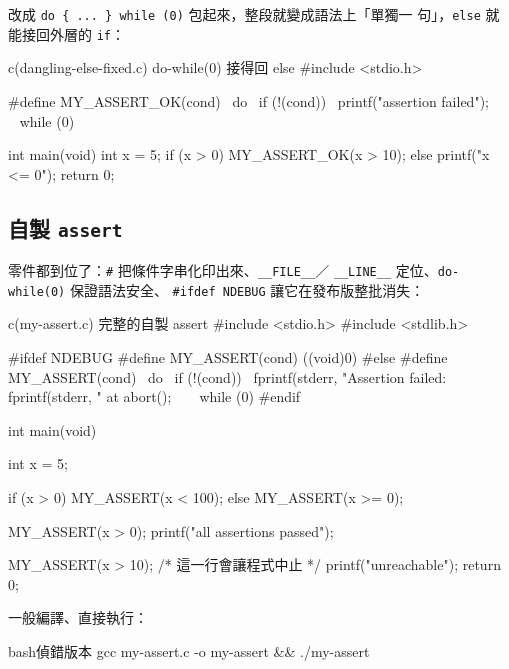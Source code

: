 改成 \texttt{do \{ ... \} while (0)} 包起來，整段就變成語法上「單獨一
句」，\texttt{else} 就能接回外層的 \texttt{if}：

\begin{example}{c}{(dangling-else-fixed.c) do-while(0) 接得回 else}
#include <stdio.h>

#define MY_ASSERT_OK(cond) \
    do { \
        if (!(cond)) { \
            printf("assertion failed\n"); \
        } \
    } while (0)

int main(void) {
    int x = 5;
    if (x > 0)
        MY_ASSERT_OK(x > 10);
    else
        printf("x <= 0\n");
    return 0;
}
\end{example}


\subsection{自製 \texttt{assert}}

零件都到位了：\texttt{\#} 把條件字串化印出來、\texttt{\_\_FILE\_\_}／
\texttt{\_\_LINE\_\_} 定位、\texttt{do-while(0)} 保證語法安全、
\texttt{\#ifdef NDEBUG} 讓它在發布版整批消失：

\begin{example}{c}{(my-assert.c) 完整的自製 assert}
#include <stdio.h>
#include <stdlib.h>

#ifdef NDEBUG
    #define MY_ASSERT(cond) ((void)0)
#else
    #define MY_ASSERT(cond) \
        do { \
            if (!(cond)) { \
                fprintf(stderr, "Assertion failed: %
                fprintf(stderr, "  at %
                abort(); \
            } \
        } while (0)
#endif

int main(void) {
    int x = 5;

    if (x > 0)
        MY_ASSERT(x < 100);
    else
        MY_ASSERT(x >= 0);

    MY_ASSERT(x > 0);
    printf("all assertions passed\n");

    MY_ASSERT(x > 10); /* 這一行會讓程式中止 */
    printf("unreachable\n");
    return 0;
}
\end{example}

一般編譯、直接執行：

\begin{code}{bash}{偵錯版本}
gcc my-assert.c -o my-assert && ./my-assert
\end{code}


